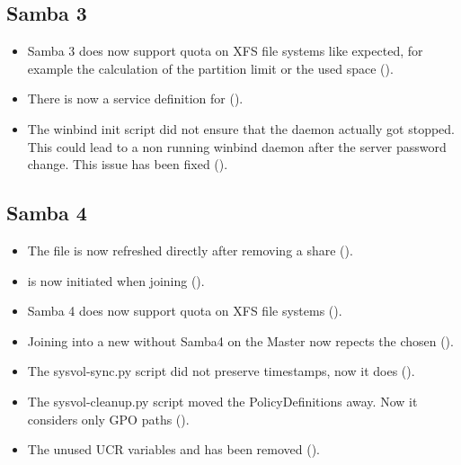 \subsection{Samba 3}
\begin{itemize}
\item Samba 3 does now support quota on XFS file systems like expected, for example the calculation of the partition limit or the used space ().
\item There is now a service definition for  ().
\item The winbind init script did not ensure that the daemon actually got stopped. This could lead
 to a non running winbind daemon after the server password change. This issue has been fixed
 ().
\end{itemize}

\subsection{Samba 4}
\begin{itemize}
\item The file  is now refreshed directly after removing a share ().
\item {} is now initiated when joining  ().
\item Samba 4 does now support quota on XFS file systems ().
\item Joining into a new  without Samba4 on the Master now repects the chosen  ().
\item The sysvol-sync.py script did not preserve timestamps, now it does ().
\item The sysvol-cleanup.py script moved the PolicyDefinitions away. Now it considers only GPO paths ().
\item The unused UCR variables  and  has been removed ().
\end{itemize}


